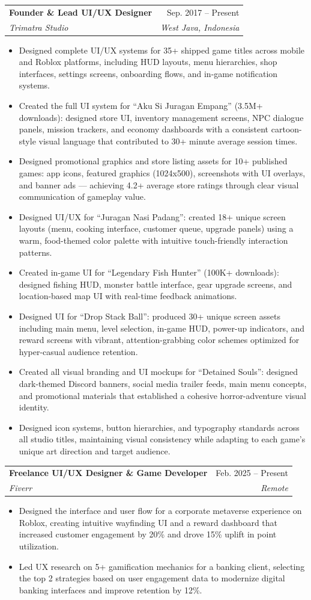 \documentclass[letterpaper,11pt]{article}
\makeatletter
\newcommand{\resumeItem}[1]{
  \item\small{
    {#1 \vspace{-2pt}}
  }
}
\newcommand{\resumeSubheading}[4]{
  \vspace{-2pt}\item
    \begin{tabular*}{0.97\textwidth}[t]{l@{\extracolsep{\fill}}r}
      \textbf{#1} & #2 \\
      \textit{\small#3} & \textit{\small #4} \\
    \end{tabular*}\vspace{-7pt}
}
\newcommand{\resumeItemListStart}{\begin{itemize}}
\newcommand{\resumeItemListEnd}{\end{itemize}\vspace{-5pt}}
\makeatother
\begin{document}
    \resumeSubheading
      {Founder \& Lead UI/UX Designer}{Sep. 2017 -- Present}
      {Trimatra Studio}{West Java, Indonesia}
      \resumeItemListStart
        \resumeItem{Designed complete UI/UX systems for 35+ shipped game titles across mobile and Roblox platforms, including HUD layouts, menu hierarchies, shop interfaces, settings screens, onboarding flows, and in-game notification systems.}
        \resumeItem{Created the full UI system for ``Aku Si Juragan Empang'' (3.5M+ downloads): designed store UI, inventory management screens, NPC dialogue panels, mission trackers, and economy dashboards with a consistent cartoon-style visual language that contributed to 30+ minute average session times.}
        \resumeItem{Designed promotional graphics and store listing assets for 10+ published games: app icons, featured graphics (1024x500), screenshots with UI overlays, and banner ads — achieving 4.2+ average store ratings through clear visual communication of gameplay value.}
        \resumeItem{Designed UI/UX for ``Juragan Nasi Padang'': created 18+ unique screen layouts (menu, cooking interface, customer queue, upgrade panels) using a warm, food-themed color palette with intuitive touch-friendly interaction patterns.}
        \resumeItem{Created in-game UI for ``Legendary Fish Hunter'' (100K+ downloads): designed fishing HUD, monster battle interface, gear upgrade screens, and location-based map UI with real-time feedback animations.}
        \resumeItem{Designed UI for ``Drop Stack Ball'': produced 30+ unique screen assets including main menu, level selection, in-game HUD, power-up indicators, and reward screens with vibrant, attention-grabbing color schemes optimized for hyper-casual audience retention.}
        \resumeItem{Created all visual branding and UI mockups for ``Detained Souls'': designed dark-themed Discord banners, social media trailer feeds, main menu concepts, and promotional materials that established a cohesive horror-adventure visual identity.}
        \resumeItem{Designed icon systems, button hierarchies, and typography standards across all studio titles, maintaining visual consistency while adapting to each game's unique art direction and target audience.}
      \resumeItemListEnd

    \resumeSubheading
      {Freelance UI/UX Designer \& Game Developer}{Feb. 2025 -- Present}
      {Fiverr}{Remote}
      \resumeItemListStart
        \resumeItem{Designed the interface and user flow for a corporate metaverse experience on Roblox, creating intuitive wayfinding UI and a reward dashboard that increased customer engagement by 20\% and drove 15\% uplift in point utilization.}
        \resumeItem{Led UX research on 5+ gamification mechanics for a banking client, selecting the top 2 strategies based on user engagement data to modernize digital banking interfaces and improve retention by 12\%.}
      \resumeItemListEnd
\end{document}
